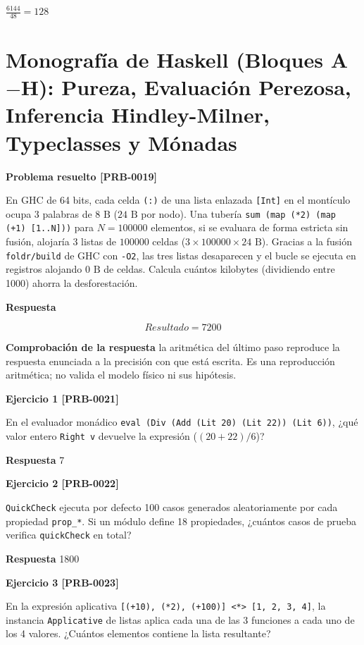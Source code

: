 \documentclass{book}
\begin{document}
\(\frac{6144}{48} = 128\)

\section{Monografía de Haskell (Bloques A\(-\)H): Pureza, Evaluación Perezosa, Inferencia Hindley-Milner, Typeclasses y Mónadas}

\noindent\textbf{Problema resuelto [PRB-0019]}

En GHC de 64 bits, cada celda \texttt{(:)} de una lista enlazada \texttt{[Int]} en el montículo ocupa \(3\) palabras de \(8\text{ B}\) (\(24\text{ B}\) por nodo). Una tubería \texttt{sum (map (*2) (map (+1) [1..N]))} para \(N = 100000\) elementos, si se evaluara de forma estricta sin fusión, alojaría \(3\) listas de \(100000\) celdas (\(3 \times 100000 \times 24\text{ B}\)). Gracias a la fusión \texttt{foldr/build} de GHC con \texttt{-O2}, las tres listas desaparecen y el bucle se ejecuta en registros alojando \(0\text{ B}\) de celdas. Calcula cuántos kilobytes (dividiendo entre 1000) ahorra la desforestación.

\noindent\textbf{Respuesta}

\[
Resultado = 7200
\]

\noindent\textbf{Comprobación de la respuesta} la aritmética del último paso reproduce la respuesta enunciada a la precisión con que está escrita. Es una reproducción aritmética; no valida el modelo físico ni sus hipótesis.

\noindent\textbf{Ejercicio 1 [PRB-0021]}

En el evaluador monádico \texttt{eval (Div (Add (Lit 20) (Lit 22)) (Lit 6))}, ¿qué valor entero \texttt{Right v} devuelve la expresión (\((20 + 22) / 6\))?

\noindent\textbf{Respuesta} 7

\noindent\textbf{Ejercicio 2 [PRB-0022]}

\texttt{QuickCheck} ejecuta por defecto 100 casos generados aleatoriamente por cada propiedad \texttt{prop\_*}. Si un módulo define 18 propiedades, ¿cuántos casos de prueba verifica \texttt{quickCheck} en total?

\noindent\textbf{Respuesta} 1800

\noindent\textbf{Ejercicio 3 [PRB-0023]}

En la expresión aplicativa \texttt{[(+10), (*2), (+100)] <*> [1, 2, 3, 4]}, la instancia \texttt{Applicative} de listas aplica cada una de las 3 funciones a cada uno de los 4 valores. ¿Cuántos elementos contiene la lista resultante?
\end{document}
